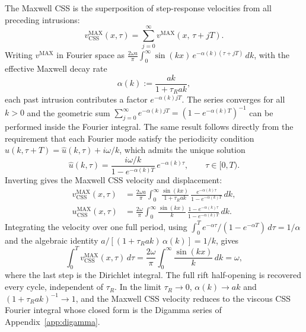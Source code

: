 \documentclass[12pt]{article}
\begin{document}
The Maxwell CSS is the superposition of step-response velocities from all
preceding intrusions:
\begin{equation}
  v_{\text{CSS}}^{\text{MAX}}(x,\tau)
  = \sum_{j=0}^{\infty} v^{\text{MAX}}(x,\,\tau + jT).
\end{equation}
Writing $v^{\text{MAX}}$ in Fourier space as
$\frac{2\omega a}{\pi}\int_0^\infty \sin(kx)\,e^{-\alpha(k)(\tau+jT)}\,dk$,
with the effective Maxwell decay rate
\begin{equation}
  \alpha(k) := \frac{ak}{1+\tau_R ak},
  \label{eq:alpha_k_app}
\end{equation}
each past intrusion contributes a factor $e^{-\alpha(k)jT}$. The series
converges for all $k>0$ and the geometric sum
$\sum_{j=0}^{\infty}e^{-\alpha(k)jT} = (1-e^{-\alpha(k)T})^{-1}$ can be
performed inside the Fourier integral. The same result follows directly
from the requirement that each Fourier mode satisfy the periodicity
condition $\hat{u}(k,\tau+T) = \hat{u}(k,\tau) + i\omega/k$, which
admits the unique solution
\begin{equation}
  \hat{u}(k,\tau) = \frac{i\omega/k}{1-e^{-\alpha(k)T}}\,e^{-\alpha(k)\tau},
  \qquad \tau\in[0,T).
\end{equation}
Inverting gives the Maxwell CSS velocity and displacement:
\begin{align}
  v_{\text{CSS}}^{\text{MAX}}(x,\tau)
  &= \frac{2\omega a}{\pi}\int_0^{\infty}
     \frac{\sin(kx)}{1+\tau_R ak}\,
     \frac{e^{-\alpha(k)\tau}}{1-e^{-\alpha(k)T}}\,dk, \\
  u_{\text{CSS}}^{\text{MAX}}(x,\tau)
  &= \frac{2\omega}{\pi}\int_0^{\infty}
     \frac{\sin(kx)}{k}\,
     \frac{1-e^{-\alpha(k)\tau}}{1-e^{-\alpha(k)T}}\,dk.
\end{align}
Integrating the velocity over one full period, using
$\int_0^T e^{-\alpha\tau}/(1-e^{-\alpha T})\,d\tau = 1/\alpha$ and the
algebraic identity $a/[(1+\tau_R ak)\,\alpha(k)] = 1/k$, gives
\begin{equation}
  \int_0^T v_{\text{CSS}}^{\text{MAX}}(x,\tau)\,d\tau
  = \frac{2\omega}{\pi}\int_0^{\infty}
    \frac{\sin(kx)}{k}\,dk = \omega,
\end{equation}
where the last step is the Dirichlet integral. The full rift half-opening
is recovered every cycle, independent of $\tau_R$. In the limit
$\tau_R\to 0$, $\alpha(k)\to ak$ and $(1+\tau_R ak)^{-1}\to 1$, and the
Maxwell CSS velocity reduces to the viscous CSS Fourier integral whose
closed form is the Digamma series of Appendix~\ref{app:digamma}.

\end{document}
